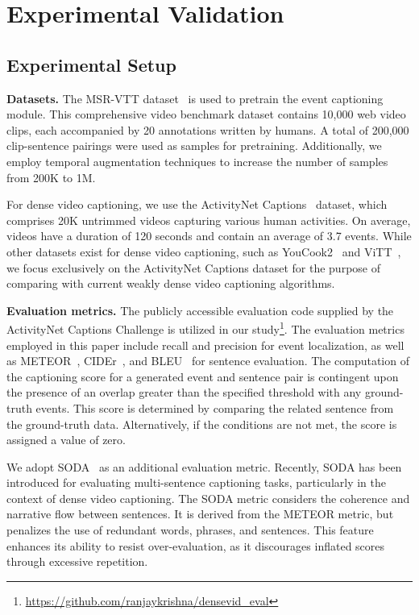 \section{Experimental Validation}

\subsection{Experimental Setup}
\label{subsec:experiment_setup}

\textbf{Datasets.}
The MSR-VTT dataset~\cite{Xu2016-ti} is used to pretrain the event captioning module.
This comprehensive video benchmark dataset contains 10,000 web video clips, each accompanied by 20 annotations written by humans.
A total of 200,000 clip-sentence pairings were used as samples for pretraining.
Additionally, we employ temporal augmentation techniques to increase the number of samples from 200K to 1M.

For dense video captioning, we use the ActivityNet Captions~\cite{Krishna2017-pw} dataset, which comprises 20K untrimmed videos capturing various human activities.
On average, videos have a duration of 120 seconds and contain an average of 3.7 events.
While other datasets exist for dense video captioning, such as YouCook2~\cite{Zhou2018-eq} and ViTT~\cite{Huang2020-as}, we focus exclusively on the ActivityNet Captions dataset for the purpose of comparing with current weakly dense video captioning algorithms.

\textbf{Evaluation metrics.}
The publicly accessible evaluation code supplied by the ActivityNet Captions Challenge is utilized in our study\footnote{\url{https://github.com/ranjaykrishna/densevid_eval}}.
The evaluation metrics employed in this paper include recall and precision for event localization, as well as METEOR~\cite{Banerjee2005-zo}, CIDEr~\cite{Vedantam2015-ma}, and BLEU~\cite{Papineni2002-sn} for sentence evaluation.
The computation of the captioning score for a generated event and sentence pair is contingent upon the presence of an overlap greater than the specified threshold with any ground-truth events.
This score is determined by comparing the related sentence from the ground-truth data.
Alternatively, if the conditions are not met, the score is assigned a value of zero.

We adopt SODA~\cite{Fujita2020-ob} as an additional evaluation metric.
Recently, SODA has been introduced for evaluating multi-sentence captioning tasks, particularly in the context of dense video captioning.
The SODA metric considers the coherence and narrative flow between sentences.
It is derived from the METEOR metric, but penalizes the use of redundant words, phrases, and sentences.
This feature enhances its ability to resist over-evaluation, as it discourages inflated scores through excessive repetition.

